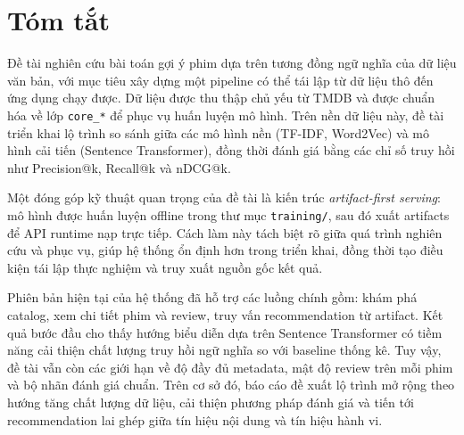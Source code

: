 \chapter*{Tóm tắt}

Đề tài \ProjectName{} nghiên cứu bài toán gợi ý phim dựa trên tương đồng ngữ nghĩa của dữ liệu văn bản, với mục tiêu xây dựng một pipeline có thể tái lập từ dữ liệu thô đến ứng dụng chạy được. Dữ liệu được thu thập chủ yếu từ TMDB và được chuẩn hóa về lớp \texttt{core\_*} để phục vụ huấn luyện mô hình. Trên nền dữ liệu này, đề tài triển khai lộ trình so sánh giữa các mô hình nền (TF-IDF, Word2Vec) và mô hình cải tiến (Sentence Transformer), đồng thời đánh giá bằng các chỉ số truy hồi như Precision@k, Recall@k và nDCG@k.

Một đóng góp kỹ thuật quan trọng của đề tài là kiến trúc \textit{artifact-first serving}: mô hình được huấn luyện offline trong thư mục \texttt{training/}, sau đó xuất artifacts để API runtime nạp trực tiếp. Cách làm này tách biệt rõ giữa quá trình nghiên cứu và phục vụ, giúp hệ thống ổn định hơn trong triển khai, đồng thời tạo điều kiện tái lập thực nghiệm và truy xuất nguồn gốc kết quả.

Phiên bản hiện tại của hệ thống đã hỗ trợ các luồng chính gồm: khám phá catalog, xem chi tiết phim và review, truy vấn recommendation từ artifact. Kết quả bước đầu cho thấy hướng biểu diễn dựa trên Sentence Transformer có tiềm năng cải thiện chất lượng truy hồi ngữ nghĩa so với baseline thống kê. Tuy vậy, đề tài vẫn còn các giới hạn về độ đầy đủ metadata, mật độ review trên mỗi phim và bộ nhãn đánh giá chuẩn. Trên cơ sở đó, báo cáo đề xuất lộ trình mở rộng theo hướng tăng chất lượng dữ liệu, cải thiện phương pháp đánh giá và tiến tới recommendation lai ghép giữa tín hiệu nội dung và tín hiệu hành vi.
